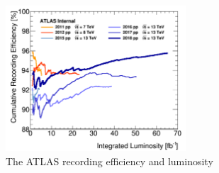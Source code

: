 \begin{figure}[!h]                
	\includegraphics[width=0.6\textwidth]{Chapter2/recefficiency.png}
	\centering
	\begin{center}
		\caption{The ATLAS recording efficiency and luminosity \cite{Pontecorvo:2638061}}
		\label{Fig:recefficiency}            
	\end{center}
\end{figure}
